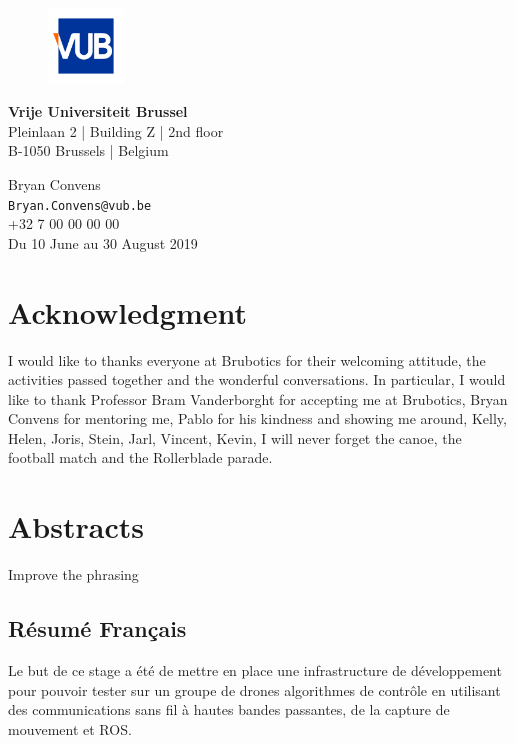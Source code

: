 \begin{titlepage}
 \vfill
 \begin{figure}[h!]
  \hspace{0.29cm}
  \includegraphics[width=2cm]{logos/vub_logo.jpg}
 \end{figure}
 \begin{minipage}{8cm}
  \textbf{Vrije Universiteit Brussel}\\
  Pleinlaan 2 | Building Z | 2nd floor\\
  B-1050 Brussels | Belgium
 \end{minipage} \hfill
 \begin{minipage}{7cm}
  \begin{flushright}
   Bryan Convens\\
   \texttt{Bryan.Convens@vub.be}\\
   +32 7 00 00 00 00\\ \vspace{0.2cm}
   Du 10 June au 30 August 2019
  \end{flushright}
 \end{minipage}

\end{titlepage}


\chapter*{Acknowledgment}
I would like to thanks everyone at Brubotics for their welcoming attitude,
the activities passed together and the wonderful conversations.
In particular, I would like to thank Professor Bram Vanderborght for accepting me at Brubotics,
Bryan Convens for mentoring me, Pablo for his kindness and showing me around,
Kelly, Helen, Joris, Stein, Jarl, Vincent, Kevin, I will never forget the canoe, the football match and the Rollerblade parade.

\chapter*{Abstracts}
{\color{red}Improve the phrasing}
\section*{Résumé Français}
Le but de ce stage a été de mettre en place une infrastructure de développement pour pouvoir tester sur un groupe de drones algorithmes de contrôle en utilisant des communications sans fil à hautes bandes passantes, de la capture de mouvement et ROS.

